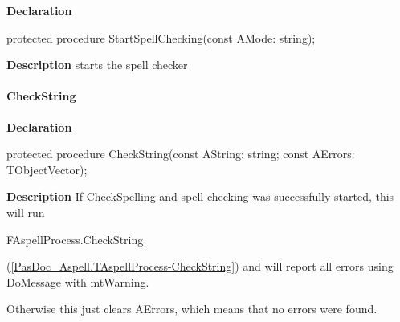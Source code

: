 \documentclass{report}
\newif\ifpdf
\begin{document}
\label{PasDoc_Gen.TDocGenerator-StartSpellChecking}
\begin{list}{}{
\setlength{\itemindent}{0cm}
\setlength{\listparindent}{0cm}
\setlength{\leftmargin}{\evensidemargin}
\addtolength{\leftmargin}{\tmplength}
\settowidth{\labelsep}{X}
\addtolength{\leftmargin}{\labelsep}
\setlength{\labelwidth}{\tmplength}
}
\item[\textbf{Declaration}\hfill]
\ifpdf
\begin{flushleft}
\fi
\begin{ttfamily}
protected procedure StartSpellChecking(const AMode: string);\end{ttfamily}

\ifpdf
\end{flushleft}
\fi

\par
\item[\textbf{Description}]
starts the spell checker

\end{list}
\paragraph*{CheckString}\hspace*{\fill}

\label{PasDoc_Gen.TDocGenerator-CheckString}
\begin{list}{}{
\setlength{\itemindent}{0cm}
\setlength{\listparindent}{0cm}
\setlength{\leftmargin}{\evensidemargin}
\addtolength{\leftmargin}{\tmplength}
\settowidth{\labelsep}{X}
\addtolength{\leftmargin}{\labelsep}
\setlength{\labelwidth}{\tmplength}
}
\item[\textbf{Declaration}\hfill]
\ifpdf
\begin{flushleft}
\fi
\begin{ttfamily}
protected procedure CheckString(const AString: string; const AErrors: TObjectVector);\end{ttfamily}

\ifpdf
\end{flushleft}
\fi

\par
\item[\textbf{Description}]
If CheckSpelling and spell checking was successfully started, this will run \begin{ttfamily}FAspellProcess.CheckString\end{ttfamily}(\ref{PasDoc_Aspell.TAspellProcess-CheckString}) and will report all errors using DoMessage with mtWarning.

Otherwise this just clears AErrors, which means that no errors were found.

\end{list}
\end{document}
